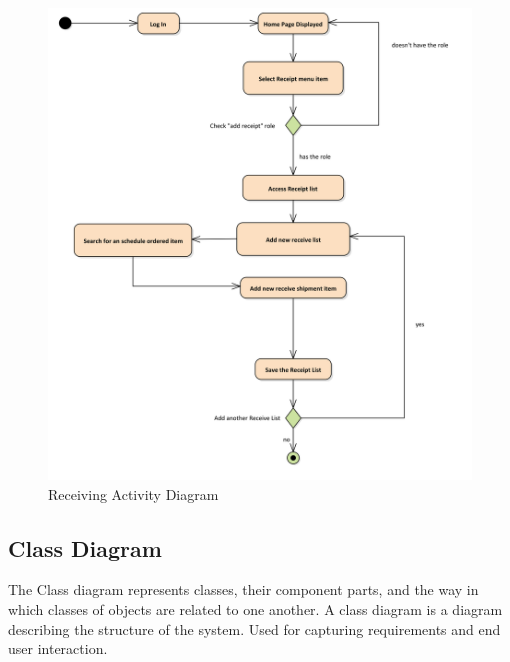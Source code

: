 \documentclass[12pt]{report} %
\begin{document}
\begin{figure}[h]
	\includegraphics[width=1\textwidth]{pic/Activity/receive.png}
	\caption{Receiving Activity Diagram}
	\label{fig:receive}
\end{figure}

\fi
\clearpage


\subsection{Class Diagram}
The Class diagram represents classes, their component parts, and the way in which classes of objects are related to one another. A class diagram is a diagram describing the structure of the system. Used for capturing requirements and end user interaction.\\
\end{document}
